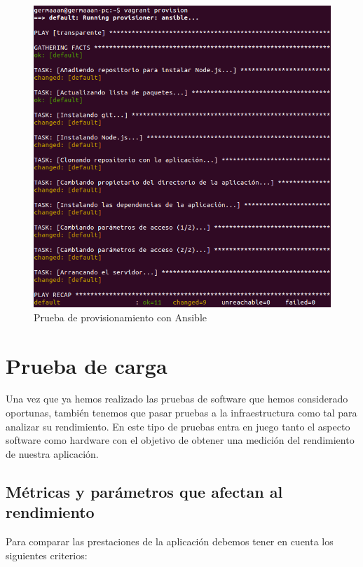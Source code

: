 \begin{figure}[!ht]
	\begin{center}
		\includegraphics[width=1\textwidth]{../images/provision.png}
		\caption{Prueba de provisionamiento con Ansible}
		\label{fig:provision}
	\end{center}
\end{figure}

\newpage
\section{Prueba de carga}

Una vez que ya hemos realizado las pruebas de software que hemos considerado oportunas, también tenemos que pasar pruebas a la infraestructura como tal para analizar su rendimiento. En este tipo de pruebas entra en juego tanto el aspecto software como hardware con el objetivo de obtener una medición del rendimiento de nuestra aplicación.

\newpage
\subsection{Métricas y parámetros que afectan al rendimiento}

Para comparar las prestaciones de la aplicación debemos tener en cuenta los siguientes criterios:

